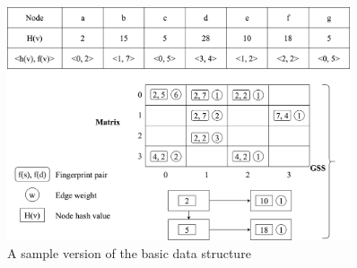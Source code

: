 \begin{figure}[H]
    \centering
    \includegraphics[width=0.9\textwidth]{images/gss2}
    \caption{A sample version of the basic data structure\cite{gou_fast_2018}}
    \label{figure:gss2}
\end{figure}


